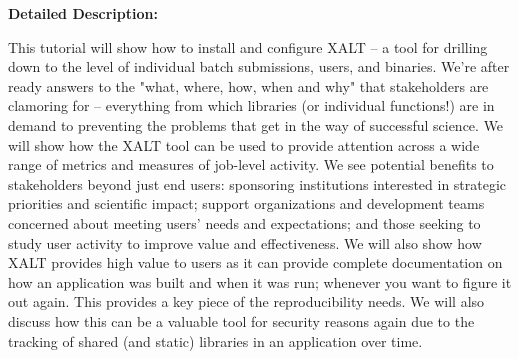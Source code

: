 \documentclass[12pt]{article}
\begin{document}
%
%
%
%
%
%
% 
% 
%
%
%
%
%
%

\noindent
{\bf{}Detailed Description:} 


This tutorial will show how to install and configure XALT – a tool for
drilling down to the level of individual batch submissions, users, and
binaries. We’re after ready answers to the "what, where, how, when and
why" that stakeholders are clamoring for – everything from which
libraries (or individual functions!) are in demand to preventing the
problems that get in the way of successful science. We will show how
the XALT tool can be used to provide attention across a wide range of
metrics and measures of job-level activity. We see potential benefits
to stakeholders beyond just end users: sponsoring institutions
interested in strategic priorities and scientific impact; support
organizations and development teams concerned about meeting users’
needs and expectations; and those seeking to study user activity to
improve value and effectiveness. We will also show how XALT provides
high value to users as it can provide complete documentation on how an
application was built and when it was run; whenever you want to figure
it out again. This provides a key piece of the reproducibility
needs. We will also discuss how this can be a valuable tool for
security reasons again due to the tracking of shared (and static)
libraries in an application over time. 
\end{document}
